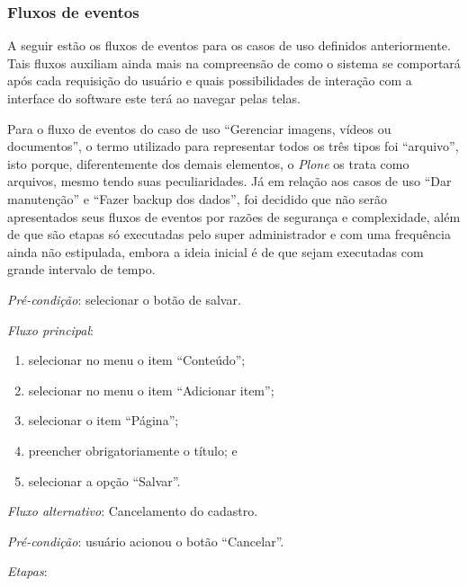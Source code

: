\newpage

\hspace{2.5cm}
\subsubsection{Fluxos de eventos}
\label{subsubsec:fluxos}
\hspace{2.5cm}

A seguir estão os fluxos de eventos para os casos de uso definidos anteriormente. Tais fluxos auxiliam ainda mais na compreensão de como o sistema se comportará após cada requisição do usuário e quais possibilidades de interação com a interface do software este terá ao navegar pelas telas. 

Para o fluxo de eventos do caso de uso ``Gerenciar imagens, vídeos ou documentos'', o termo utilizado para representar todos os três tipos foi ``arquivo'', isto porque, diferentemente dos demais elementos, o \textit{Plone} os trata como arquivos, mesmo tendo suas peculiaridades. Já em relação aos casos de uso ``Dar manutenção'' e ``Fazer backup dos dados'', foi decidido que não serão apresentados seus fluxos de eventos por razões de segurança e complexidade, além de que são etapas só executadas pelo super administrador e com uma frequência ainda não estipulada, embora a ideia inicial é de que sejam executadas com grande intervalo de tempo.  


\vspace{0.7cm}

\noindent \textit{Pré-condição}: selecionar o botão de salvar.

\noindent \textit{Fluxo principal}:

\begin{enumerate}
    \item selecionar no menu o item ``Conteúdo'';
    \item selecionar no menu o item ``Adicionar item'';
    \item selecionar o item ``Página'';
    \item preencher obrigatoriamente o título; e
    \item selecionar a opção ``Salvar''.
\end{enumerate}

\noindent \textit{Fluxo alternativo}: Cancelamento do cadastro.

\noindent \textit{Pré-condição}: usuário acionou o botão ``Cancelar''.

\noindent \textit{Etapas}:

